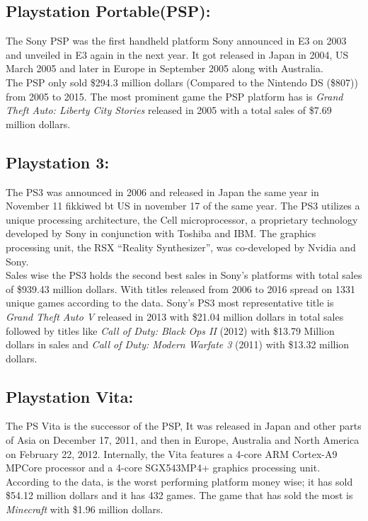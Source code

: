 \subsection{Playstation Portable(PSP):} The Sony PSP was the first handheld
platform Sony announced in E3 on 2003 and unveiled in E3 again in the next
year. It got released in Japan in 2004, US March 2005 and later in Europe in
September 2005 along with Australia\cite{Sony}.\\
The PSP only sold \$294.3 million dollars (Compared to the Nintendo DS
(\$807)) from 2005 to 2015. The most prominent game the PSP platform has is
\textit{Grand Theft Auto: Liberty City Stories} released in 2005 with a total
sales of \$7.69 million dollars.
\subsection{Playstation 3:} The PS3 was announced in 2006 and released in
Japan the same year in November 11 fikkiwed bt US in november 17 of the same
year. The PS3 utilizes a unique processing architecture, the Cell
microprocessor, a proprietary technology developed by Sony in conjunction
with Toshiba and IBM. The graphics processing unit, the RSX ``Reality
Synthesizer'', was co-developed by Nvidia and Sony\cite{Sony}.\\
Sales wise the PS3 holds the second best sales in Sony's platforms with total
sales of \$939.43 million dollars. With titles released from 2006 to 2016 spread on
1331 unique games according to the data. Sony's PS3 most representative title
is \textit{Grand Theft Auto V} released in 2013 with \$21.04 million dollars in
total sales followed by titles like \textit{Call of Duty: Black Ops II}
(2012) with \$13.79 Million dollars in sales and \textit{Call of Duty: Modern
Warfate 3} (2011) with \$13.32 million dollars.\\
\subsection{Playstation Vita:} The PS Vita is the successor of the PSP, It
was released in Japan and other parts of Asia on December 17, 2011, and
then in Europe, Australia and North America on February 22, 2012. Internally,
the Vita features a 4-core ARM Cortex-A9 MPCore processor and a 4-core
SGX543MP4+ graphics processing unit\cite{Sony}.\\
According to the data, is the worst performing platform money wise; it has
sold \$54.12 million dollars and it has 432 games. The game that has sold the
most is \textit{Minecraft} with \$1.96 million dollars.\\
